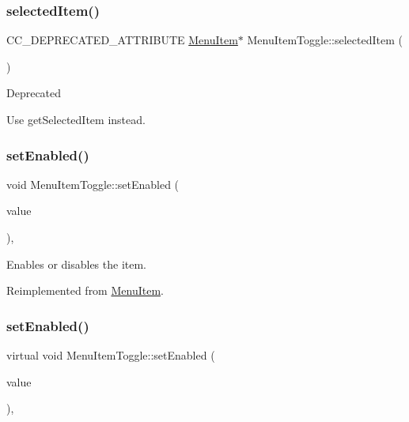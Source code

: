 \subsubsection{\texorpdfstring{selected\+Item()}{selectedItem()}\hspace{0.1cm}{\footnotesize\ttfamily [2/2]}}
{\footnotesize\ttfamily C\+C\+\_\+\+D\+E\+P\+R\+E\+C\+A\+T\+E\+D\+\_\+\+A\+T\+T\+R\+I\+B\+U\+TE \hyperlink{classMenuItem}{Menu\+Item}$\ast$ Menu\+Item\+Toggle\+::selected\+Item (\begin{DoxyParamCaption}{ }\end{DoxyParamCaption})\hspace{0.3cm}{\ttfamily [inline]}}

\begin{DoxyRefDesc}{Deprecated}
\item[\hyperlink{deprecated__deprecated000258}{Deprecated}]Use {\ttfamily get\+Selected\+Item} instead. \end{DoxyRefDesc}
\mbox{\label{classMenuItemToggle_a12277b632426398004b6588995e6d850}} 
\subsubsection{\texorpdfstring{set\+Enabled()}{setEnabled()}\hspace{0.1cm}{\footnotesize\ttfamily [1/2]}}
{\footnotesize\ttfamily void Menu\+Item\+Toggle\+::set\+Enabled (\begin{DoxyParamCaption}\item[{bool}]{value }\end{DoxyParamCaption})\hspace{0.3cm}{\ttfamily [override]}, {\ttfamily [virtual]}}

Enables or disables the item. 

Reimplemented from \hyperlink{classMenuItem_abe370fd6258192233b6bd9534344773b}{Menu\+Item}.

\mbox{\label{classMenuItemToggle_a987bb7ee9e97fb698aafebe74a86fd76}} 
\subsubsection{\texorpdfstring{set\+Enabled()}{setEnabled()}\hspace{0.1cm}{\footnotesize\ttfamily [2/2]}}
{\footnotesize\ttfamily virtual void Menu\+Item\+Toggle\+::set\+Enabled (\begin{DoxyParamCaption}\item[{bool}]{value }\end{DoxyParamCaption})\hspace{0.3cm}{\ttfamily [override]}, {\ttfamily [virtual]}}

